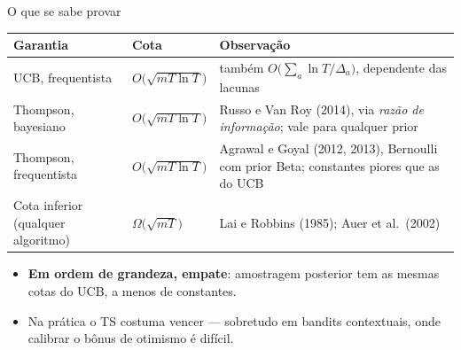 \documentclass[aspectratio=169, 11pt]{beamer}
\begin{document}
\begin{frame}{O que se sabe provar}
  \begin{center}\scriptsize
  \begin{tabular}{@{}llp{5.6cm}@{}}
    \toprule
    \textbf{Garantia} & \textbf{Cota} & \textbf{Observação} \\
    \midrule
    UCB, frequentista & $O\!\big(\sqrt{mT\ln T}\big)$ & também
      $O\!\big(\sum_a \ln T/\Delta_a\big)$, dependente das lacunas \\
    Thompson, bayesiano & $O\!\big(\sqrt{mT\ln T}\big)$ &
      Russo e Van Roy (2014), via \emph{razão de informação}; vale para
      qualquer prior \\
    Thompson, frequentista & $O\!\big(\sqrt{mT\ln T}\big)$ &
      Agrawal e Goyal (2012, 2013), Bernoulli com prior Beta; constantes
      piores que as do UCB \\
    Cota inferior (qualquer algoritmo) & $\Omega\!\big(\sqrt{mT}\big)$ &
      Lai e Robbins (1985); Auer et al.\ (2002) \\
    \bottomrule
  \end{tabular}
  \end{center}

  \smallskip
  \begin{itemize}
    \item \textbf{Em ordem de grandeza, empate}: amostragem posterior tem
          as mesmas cotas do UCB, a menos de constantes.
    \item Na prática o TS costuma vencer — sobretudo em bandits
          \alert{contextuais}, onde calibrar o bônus de otimismo é difícil.
  \end{itemize}
\end{frame}
\end{document}
